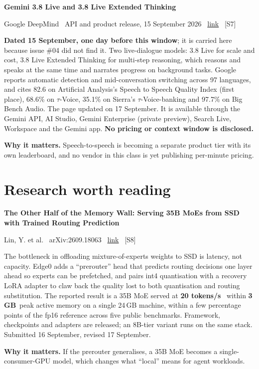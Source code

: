 \documentclass[11pt,a4paper]{article}
\newcommand{\entry}[4]{%
  \par\vspace{0.7em}%
  {\sffamily\bfseries\color{brandink}#1}\par
  {\footnotesize\color{brandgrey}#2 \textbullet\ \href{#3}{link} \textbullet\ \srcref{#4}}\par
  \vspace{0.15em}}
\newcommand{\why}[1]{\par{\small\textbf{Why it matters.} #1}\par}
\newcommand{\srcref}[1]{\textcolor{brandaccent}{[S#1]}}
\newcommand{\stat}[2]{{\sffamily\bfseries\color{brandink}#1}~{\footnotesize\color{brandgrey}#2}}
\begin{document}
\entry{Gemini 3.8 Live and 3.8 Live Extended Thinking}{Google DeepMind \textbullet\ API and product release, 15 September 2026}{https://blog.google/innovation-and-ai/models-and-research/gemini-models/gemini-3-8-live-gemini-3-8-live-extended-thinking/}{7}
\textbf{Dated 15 September, one day before this window}; it is carried here because
issue \#04 did not find it. Two live-dialogue models: 3.8 Live for scale and cost,
3.8 Live Extended Thinking for multi-step reasoning, which reasons and speaks at the
same time and narrates progress on background tasks. Google reports automatic
detection and mid-conversation switching across 97 languages, and cites 82.6 on
Artificial Analysis's Speech to Speech Quality Index (first place), 68.6\% on
$\tau$-Voice, 35.1\% on Sierra's $\tau$-Voice-banking and 97.7\% on Big Bench Audio.
The page updated on 17 September. It is available through the Gemini API, AI Studio,
Gemini Enterprise (private preview), Search Live, Workspace and the Gemini app.
\textbf{No pricing or context window is disclosed.}
\why{Speech-to-speech is becoming a separate product tier with its own leaderboard,
and no vendor in this class is yet publishing per-minute pricing.}

\section{Research worth reading}

\entry{The Other Half of the Memory Wall: Serving 35B MoEs from SSD with Trained Routing Prediction}{Lin, Y. et al. \textbullet\ arXiv:2609.18063}{https://arxiv.org/abs/2609.18063}{8}
The bottleneck in offloading mixture-of-experts weights to SSD is latency, not
capacity. Edge0 adds a ``prerouter'' head that predicts routing decisions one layer
ahead so experts can be prefetched, and pairs int4 quantisation with a recovery LoRA
adapter to claw back the quality lost to both quantisation and routing substitution.
The reported result is a 35B MoE served at \stat{20 tokens/s}{} within
\stat{3\,GB}{peak active memory} on a single 24\,GB machine, within a few percentage
points of the fp16 reference across five public benchmarks. Framework, checkpoints
and adapters are released; an 8B-tier variant runs on the same stack.
Submitted 16 September, revised 17 September.
\why{If the prerouter generalises, a 35B MoE becomes a single-consumer-GPU model,
which changes what ``local'' means for agent workloads.}
\end{document}
